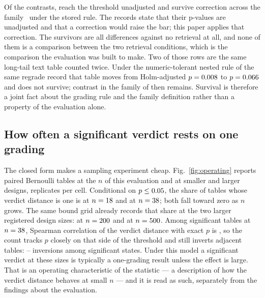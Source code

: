 Of the \Contrasts{} contrasts, \SignificantRaw{} reach the threshold unadjusted
and \SurvivesHolm{} survive correction across the family~\cite{holm1979simple}
under the stored rule. The records state that their p-values are unadjusted and
that a correction would raise the bar; this paper applies that correction. The
survivors are all differences against no retrieval at all, and none of them is
a comparison between the two retrieval conditions, which is the comparison the
evaluation was built to make. Two of those \SurvivesHolm{} rows are the same
long-tail text table counted twice. Under the numeric-tolerant nested rule of
the same regrade record that table moves from Holm-adjusted \(p=0.008{}\) to
\(p=0.066{}\) and does not survive; \NumericHolmSurvivors{} contrast in
the family of \Contrasts{} then remains. Survival is therefore a joint fact
about the grading rule and the family definition rather than a property of the
evaluation alone.

\subsection{How often a significant verdict rests on one grading}

The closed form makes a sampling experiment cheap. Fig.~\ref{fig:operating}
reports \SimTables{} paired Bernoulli tables at the \(n\) of this evaluation and
at smaller and larger designs, \SimReps{} replicates per cell. Conditional on
\(p\le0.05{}\), the share of tables whose verdict distance is one is
\FragileGivenSigNEighteen{} at \(n=18{}\) and
\FragileGivenSigNThirtyEight{} at \(n=38{}\); both fall toward zero as
\(n\) grows. The same bound grid already records that share at the two
larger registered design sizes: \FragileGivenSigNTwoHundred{} at
\(n=200{}\) and \FragileGivenSigNFiveHundred{} at
\(n=500{}\). Among significant tables at \(n=38{}\), Spearman correlation
of the verdict distance with exact \(p\) is \SpearmanSigNThirtyEight{}, so the
count tracks \(p\) closely on that side of the threshold and still inverts
adjacent tables: \KappaVerInversionsLow{}--\KappaVerInversionsHigh{} inversions
among \KappaVerSigTables{} significant states. Under this model a significant
verdict at these sizes is typically a one-grading result unless the effect is
large. That is an operating characteristic of the statistic --- a description
of how the verdict distance behaves at small \(n\) --- and it is read as such,
separately from the findings about the evaluation.

